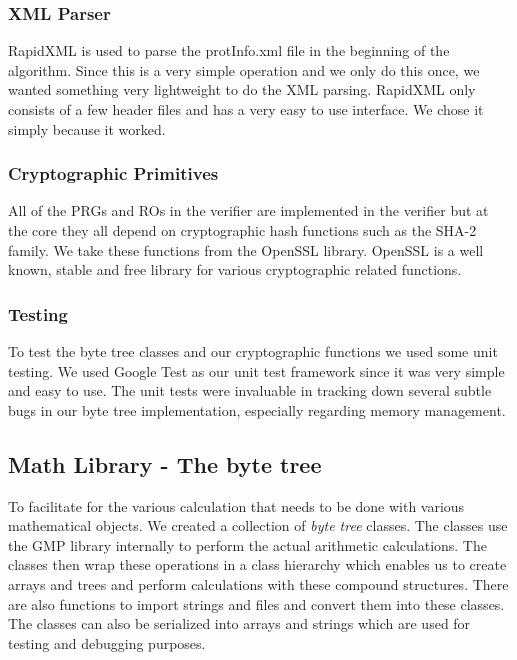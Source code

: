 \subsubsection{XML Parser}

RapidXML is used to parse the protInfo.xml file in the beginning of the algorithm. Since this is a very simple operation and we only do this once, we wanted something very lightweight to do the XML parsing. RapidXML only consists of a few header files and has a very easy to use interface. We chose it simply because it worked.

\subsubsection{Cryptographic Primitives}

All of the PRGs and ROs in the verifier are implemented in the verifier but at the core they all depend on cryptographic hash functions such as the SHA-2 family. We take these functions from the OpenSSL library. OpenSSL is a well known, stable and free library for various cryptographic related functions.

\subsubsection{Testing}

To test the byte tree classes and our cryptographic functions we used some unit testing. We used Google Test as our unit test framework since it was very simple and easy to use. The unit tests were invaluable in tracking down several subtle bugs in our byte tree implementation, especially regarding memory management.

\subsection{Math Library - The byte tree}

To facilitate for the various calculation that needs to be done with various mathematical objects. We created a collection of \emph{byte tree} classes. The classes use the GMP library internally to perform the actual arithmetic calculations. The classes then wrap these operations in a class hierarchy which enables us to create arrays and trees and perform calculations with these compound structures. There are also functions to import strings and files and convert them into these classes. The classes can also be serialized into arrays and strings which are used for testing and debugging purposes.

